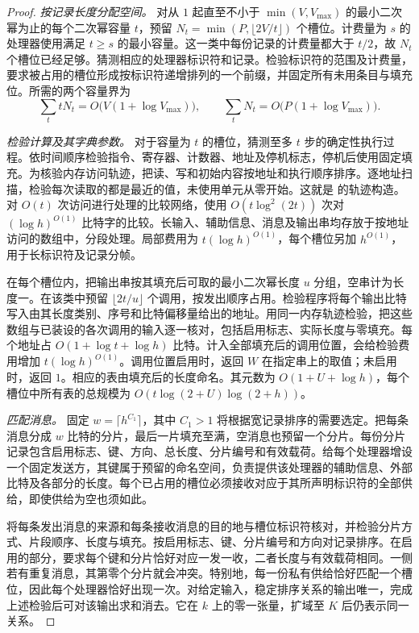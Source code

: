 \begin{proof}
\emph{按记录长度分配空间。}
对从 $1$ 起直至不小于 $\min(V,V_{\max})$ 的最小二次幂为止的每个二次幂容量 $t$，预留 $N_t=\min(P,\lfloor 2V/t\rfloor)$ 个槽位。计费量为 $s$ 的处理器使用满足 $t\ge s$ 的最小容量。这一类中每份记录的计费量都大于 $t/2$，故 $N_t$ 个槽位已经足够。猜测相应的处理器标识符和记录。检验标识符的范围及计费量，要求被占用的槽位形成按标识符递增排列的一个前缀，并固定所有未用条目与填充位。所需的两个容量界为
\begin{equation}\label{eq:asm-seats}
 \sum_t tN_t=O\bigl(V(1+\log V_{\max})\bigr),\qquad
 \sum_t N_t=O\bigl(P(1+\log V_{\max})\bigr).
\end{equation}

\emph{检验计算及其字典参数。}
对于容量为 $t$ 的槽位，猜测至多 $t$ 步的确定性执行过程。依时间顺序检验指令、寄存器、计数器、地址及停机标志，停机后使用固定填充。为核验内存访问轨迹，把读、写和初始内容按地址和执行顺序排序。逐地址扫描，检验每次读取的都是最近的值，未使用单元从零开始。这就是 \citet[第~~节]{oaG} 的轨迹构造。对 $O(t)$ 次访问进行处理的比较网络，使用 $O(t\log^2(2t))$ 次对 $(\log h)^{O(1)}$ 比特字的比较。长输入、辅助信息、消息及输出串均存放于按地址访问的数组中，分段处理。局部费用为 $t(\log h)^{O(1)}$，每个槽位另加 $h^{O(1)}$，用于长标识符及记录分帧。

在每个槽位内，把输出串按其填充后可取的最小二次幂长度 $u$ 分组，空串计为长度一。在该类中预留 $\lfloor2t/u\rfloor$ 个调用，按发出顺序占用。检验程序将每个输出比特写入由其长度类别、序号和比特偏移量给出的地址。用同一内存轨迹检验，把这些数组与已装设的各次调用的输入逐一核对，包括启用标志、实际长度与零填充。每个地址占 $O(1+\log t+\log h)$ 比特。计入全部填充后的调用位置，会给检验费用增加 $t(\log h)^{O(1)}$。调用位置启用时，返回 $W$ 在指定串上的取值；未启用时，返回 $1$。相应的表由填充后的长度命名。其元数为 $O(1+U+\log h)$，每个槽位中所有表的总规模为 $O(t\log(2+U)\log(2+h))$。

\emph{匹配消息。}
固定 $w=\lceil h^{C_1}\rceil$，其中 $C_1>1$ 将根据宽记录排序的需要选定。把每条消息分成 $w$ 比特的分片，最后一片填充至满，空消息也预留一个分片。每份分片记录包含启用标志、键、方向、总长度、分片编号和有效载荷。给每个处理器增设一个固定发送方，其键属于预留的命名空间，负责提供该处理器的辅助信息、外部比特及各部分的长度。每个已占用的槽位必须接收对应于其所声明标识符的全部供给，即使供给为空也须如此。

将每条发出消息的来源和每条接收消息的目的地与槽位标识符核对，并检验分片方式、片段顺序、长度与填充。按启用标志、键、分片编号和方向对记录排序。在启用的部分，要求每个键和分片恰好对应一发一收，二者长度与有效载荷相同。一侧若有重复消息，其第零个分片就会冲突。特别地，每一份私有供给恰好匹配一个槽位，因此每个处理器恰好出现一次。对给定输入，稳定排序关系的输出唯一，完成上述检验后可对该输出求和消去。它在 $k$ 上的零一张量，扩域至 $K$ 后仍表示同一关系。


\end{proof}

